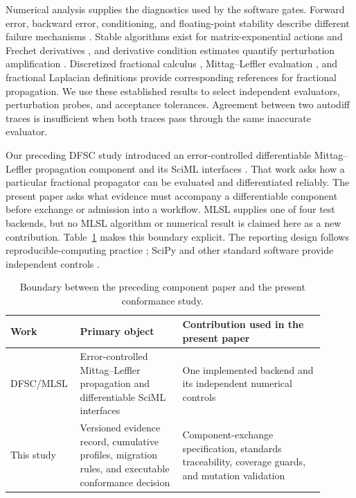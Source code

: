 \documentclass[preprint,12pt,authoryear]{elsarticle}
\begin{document}
Numerical analysis supplies the diagnostics used by the software gates. Forward error, backward error, conditioning, and floating-point stability describe different failure mechanisms \citep{higham2002accuracy}. Stable algorithms exist for matrix-exponential actions and Frechet derivatives \citep{almohy2011action,almohy2009frechet}, and derivative condition estimates quantify perturbation amplification \citep{higham2008functions,higham2014frechet}. Discretized fractional calculus \citep{lubich1986discretized}, Mittag--Leffler evaluation \citep{garrappa2015mittag,gorenflo2014mittag}, and fractional Laplacian definitions \citep{lischke2020fractional} provide corresponding references for fractional propagation. We use these established results to select independent evaluators, perturbation probes, and acceptance tolerances. Agreement between two autodiff traces is insufficient when both traces pass through the same inaccurate evaluator.

Our preceding DFSC study introduced an error-controlled differentiable Mittag--Leffler propagation component and its SciML interfaces \citep{hu2026dfsc}. That work asks how a particular fractional propagator can be evaluated and differentiated reliably. The present paper asks what evidence must accompany a differentiable component before exchange or admission into a workflow. MLSL supplies one of four test backends, but no MLSL algorithm or numerical result is claimed here as a new contribution. Table~\ref{tab:p1-p4-boundary} makes this boundary explicit. The reporting design follows reproducible-computing practice \citep{wilson2017goodenough}; SciPy and other standard software provide independent controls \citep{virtanen2020scipy}.

\begin{table}[t]
\centering
\small
\caption{Boundary between the preceding component paper and the present conformance study.}
\label{tab:p1-p4-boundary}
\begin{tabular}{p{0.16\linewidth}p{0.31\linewidth}p{0.43\linewidth}}
\toprule
Work & Primary object & Contribution used in the present paper\\
\midrule
DFSC/MLSL \citep{hu2026dfsc} & Error-controlled Mittag--Leffler propagation and differentiable SciML interfaces & One implemented backend and its independent numerical controls\\
This study & Versioned evidence record, cumulative profiles, migration rules, and executable conformance decision & Component-exchange specification, standards traceability, coverage guards, and mutation validation\\
\bottomrule
\end{tabular}
\end{table}
\end{document}
